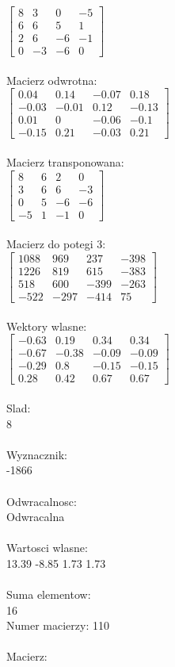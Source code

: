 \documentclass[a4paper,12pt]{article}
\begin{document}
$\begin{bmatrix} 8&3&0&-5\\6&6&5&1\\2&6&-6&-1\\0&-3&-6&0 \end{bmatrix}$
\\
\\
Macierz odwrotna:\\

$\begin{bmatrix} 0.04&0.14&-0.07&0.18\\-0.03&-0.01&0.12&-0.13\\0.01&0&-0.06&-0.1\\-0.15&0.21&-0.03&0.21 \end{bmatrix}$
\\
\\
Macierz transponowana:\\

$\begin{bmatrix} 8&6&2&0\\3&6&6&-3\\0&5&-6&-6\\-5&1&-1&0 \end{bmatrix}$
\\
\\
Macierz do potegi 3:\\

$\begin{bmatrix} 1088&969&237&-398\\1226&819&615&-383\\518&600&-399&-263\\-522&-297&-414&75 \end{bmatrix}$
\\
\\
Wektory wlasne:\\

$\begin{bmatrix} -0.63&0.19&0.34&0.34\\-0.67&-0.38&-0.09&-0.09\\-0.29&0.8&-0.15&-0.15\\0.28&0.42&0.67&0.67 \end{bmatrix}$
\\
\\
Slad:\\
8
\\
\\
Wyznacznik:\\
-1866
\\
\\
Odwracalnosc:\\
Odwracalna
\\
\\
Wartosci wlasne:\\
13.39 -8.85 1.73 1.73
\\
\\
Suma elementow:\\
16
\\
\newpage
Numer macierzy:
110
\\
\\
Macierz:\\
\end{document}
